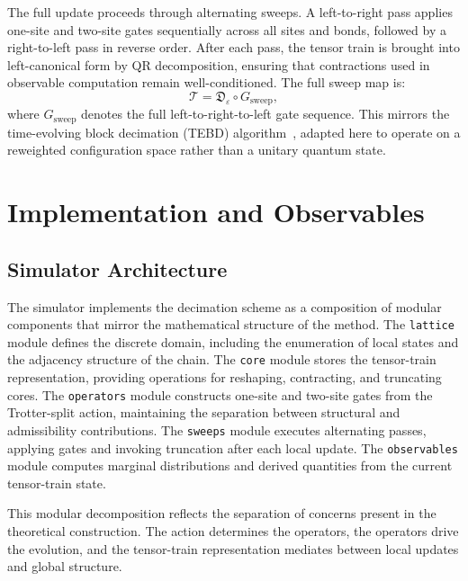 \documentclass[11pt]{article}
\theoremstyle{definition}
\begin{document}
The full update proceeds through alternating sweeps. A left-to-right pass
applies one-site and two-site gates sequentially across all sites and bonds,
followed by a right-to-left pass in reverse order. After each pass, the tensor
train is brought into left-canonical form by QR decomposition, ensuring that
contractions used in observable computation remain well-conditioned. The full
sweep map is:
\begin{equation}
  \mathcal{T} = \mathfrak{D}_\varepsilon \circ G_{\mathrm{sweep}},
  \label{eq:sweep_map}
\end{equation}
where $G_{\mathrm{sweep}}$ denotes the full left-to-right-to-left gate
sequence. This mirrors the time-evolving block decimation (TEBD)
algorithm~\cite{vidal2004tebd}, adapted here to operate on a reweighted
configuration space rather than a unitary quantum state.

\section{Implementation and Observables}

\subsection{Simulator Architecture}

The simulator implements the decimation scheme as a composition of modular
components that mirror the mathematical structure of the method. The
\texttt{lattice} module defines the discrete domain, including the enumeration
of local states and the adjacency structure of the chain. The \texttt{core}
module stores the tensor-train representation, providing operations for
reshaping, contracting, and truncating cores. The \texttt{operators} module
constructs one-site and two-site gates from the Trotter-split action,
maintaining the separation between structural and admissibility contributions.
The \texttt{sweeps} module executes alternating passes, applying gates and
invoking truncation after each local update. The \texttt{observables} module
computes marginal distributions and derived quantities from the current
tensor-train state.

This modular decomposition reflects the separation of concerns present in the
theoretical construction. The action determines the operators, the operators
drive the evolution, and the tensor-train representation mediates between local
updates and global structure.
\end{document}
